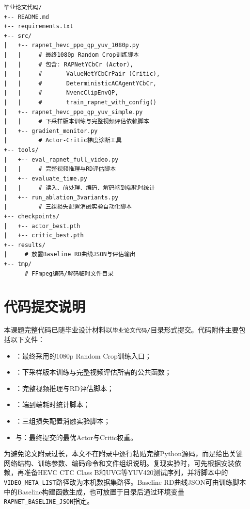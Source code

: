 \begin{lstlisting}[basicstyle=\ttfamily\small]
毕业论文代码/
+-- README.md
+-- requirements.txt
+-- src/
|   +-- rapnet_hevc_ppo_qp_yuv_1080p.py
|   |     # 最终1080p Random Crop训练脚本
|   |     # 包含: RAPNetYCbCr (Actor),
|   |     #       ValueNetYCbCrPair (Critic),
|   |     #       DeterministicACAgentYCbCr,
|   |     #       NvencClipEnvQP,
|   |     #       train_rapnet_with_config()
|   +-- rapnet_hevc_ppo_qp_yuv_simple.py
|   |     # 下采样版本训练与完整视频评估依赖脚本
|   +-- gradient_monitor.py
|         # Actor-Critic梯度诊断工具
+-- tools/
|   +-- eval_rapnet_full_video.py
|   |     # 完整视频推理与RD评估脚本
|   +-- evaluate_time.py
|   |     # 读入、前处理、编码、解码端到端耗时统计
|   +-- run_ablation_3variants.py
|         # 三组损失配置消融实验自动化脚本
+-- checkpoints/
|   +-- actor_best.pth
|   +-- critic_best.pth
+-- results/
|     # 放置Baseline RD曲线JSON与评估输出
+-- tmp/
      # FFmpeg编码/解码临时文件目录
\end{lstlisting}

\FloatBarrier

\chapter{代码提交说明}

本课题完整代码已随毕业设计材料以\texttt{毕业论文代码/}目录形式提交。代码附件主要包括以下文件：

\begin{itemize}
  \item {}：最终采用的1080p Random Crop训练入口；
  \item {}：下采样版本训练与完整视频评估所需的公共函数；
  \item {}：完整视频推理与RD评估脚本；
  \item {}：端到端耗时统计脚本；
  \item {}：三组损失配置消融实验脚本；
  \item {}与：最终提交的最优Actor与Critic权重。
\end{itemize}

为避免论文附录过长，本文不在附录中逐行粘贴完整Python源码，而是给出关键网络结构、训练参数、编码命令和文件组织说明。复现实验时，可先根据安装依赖，再准备HEVC CTC Class B和UVG等YUV420测试序列，并将脚本中的\texttt{VIDEO\_META\_LIST}路径改为本机数据集路径。Baseline RD曲线JSON可由训练脚本中的Baseline构建函数生成，也可放置于目录后通过环境变量\texttt{RAPNET\_BASELINE\_JSON}指定。


